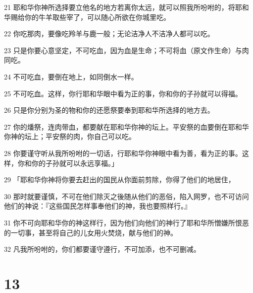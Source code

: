 \par 21 耶和华你神所选择要立他名的地方若离你太远，就可以照我所吩咐的，将耶和华赐给你的牛羊取些宰了，可以随心所欲在你城里吃。
\par 22 你吃那肉，要像吃羚羊与鹿一般；无论洁净人不洁净人都可以吃。
\par 23 只是你要心意坚定，不可吃血，因为血是生命；不可将血（原文作生命）与肉同吃。
\par 24 不可吃血，要倒在地上，如同倒水一样。
\par 25 不可吃血。这样，你行耶和华眼中看为正的事，你和你的子孙就可以得福。
\par 26 只是你分别为圣的物和你的还愿祭要奉到耶和华所选择的地方去。
\par 27 你的燔祭，连肉带血，都要献在耶和华你神的坛上。平安祭的血要倒在耶和华你神的坛上；平安祭的肉，你自己可以吃。
\par 28 你要谨守听从我所吩咐的一切话，行耶和华你神眼中看为善，看为正的事。这样，你和你的子孙就可以永远享福。」
\par 29 「耶和华你神将你要去赶出的国民从你面前剪除，你得了他们的地居住，
\par 30 那时就要谨慎，不可在他们除灭之後随从他们的恶俗，陷入网罗，也不可访问他们的神说：『这些国民怎样事奉他们的神，我也要照样行。』
\par 31 你不可向耶和华你的神这样行，因为他们向他们的神行了耶和华所憎嫌所恨恶的一切事，甚至将自己的儿女用火焚烧，献与他们的神。
\par 32 凡我所吩咐的，你们都要谨守遵行，不可加添，也不可删减。

\chapter{13}

